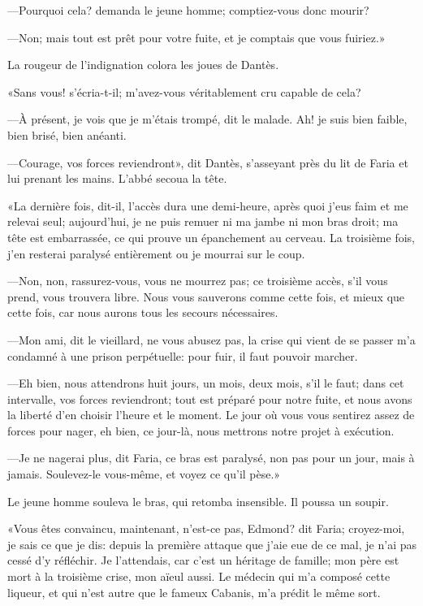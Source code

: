 —Pourquoi cela? demanda le jeune homme; comptiez-vous donc mourir?

—Non; mais tout est prêt pour votre fuite, et je comptais que vous fuiriez.»

La rougeur de l'indignation colora les joues de Dantès.

«Sans vous! s'écria-t-il; m'avez-vous véritablement cru capable de cela?

—À présent, je vois que je m'étais trompé, dit le malade. Ah! je suis bien faible, bien brisé, bien anéanti.

—Courage, vos forces reviendront», dit Dantès, s'asseyant près du lit de Faria et lui prenant les mains. L'abbé secoua la tête.

«La dernière fois, dit-il, l'accès dura une demi-heure, après quoi j'eus faim et me relevai seul; aujourd'hui, je ne puis remuer ni ma jambe ni mon bras droit; ma tête est embarrassée, ce qui prouve un épanchement au cerveau. La troisième fois, j'en resterai paralysé entièrement ou je mourrai sur le coup.

—Non, non, rassurez-vous, vous ne mourrez pas; ce troisième accès, s'il vous prend, vous trouvera libre. Nous vous sauverons comme cette fois, et mieux que cette fois, car nous aurons tous les secours nécessaires.

—Mon ami, dit le vieillard, ne vous abusez pas, la crise qui vient de se passer m'a condamné à une prison perpétuelle: pour fuir, il faut pouvoir marcher.

—Eh bien, nous attendrons huit jours, un mois, deux mois, s'il le faut; dans cet intervalle, vos forces reviendront; tout est préparé pour notre fuite, et nous avons la liberté d'en choisir l'heure et le moment. Le jour où vous vous sentirez assez de forces pour nager, eh bien, ce jour-là, nous mettrons notre projet à exécution.

—Je ne nagerai plus, dit Faria, ce bras est paralysé, non pas pour un jour, mais à jamais. Soulevez-le vous-même, et voyez ce qu'il pèse.»

Le jeune homme souleva le bras, qui retomba insensible. Il poussa un soupir.

«Vous êtes convaincu, maintenant, n'est-ce pas, Edmond? dit Faria; croyez-moi, je sais ce que je dis: depuis la première attaque que j'aie eue de ce mal, je n'ai pas cessé d'y réfléchir. Je l'attendais, car c'est un héritage de famille; mon père est mort à la troisième crise, mon aïeul aussi. Le médecin qui m'a composé cette liqueur, et qui n'est autre que le fameux Cabanis, m'a prédit le même sort.

